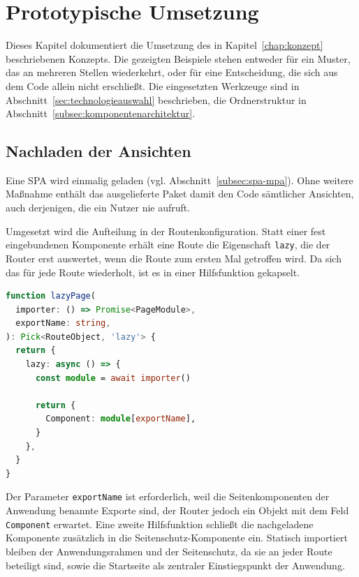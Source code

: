 
\chapter{Prototypische Umsetzung}
\label{chap:umsetzung}

Dieses Kapitel dokumentiert die Umsetzung des in
Kapitel~\ref{chap:konzept} beschriebenen Konzepts. Die gezeigten
Beispiele stehen entweder für ein Muster, das an mehreren Stellen
wiederkehrt, oder für eine Entscheidung, die sich aus dem Code allein
nicht erschließt. Die eingesetzten Werkzeuge sind in
Abschnitt~\ref{sec:technologieauswahl} beschrieben, die Ordnerstruktur
in Abschnitt~\ref{subsec:komponentenarchitektur}.

\section{Nachladen der Ansichten}
\label{sec:impl_lazyloading}
 
Eine \acs{SPA} wird einmalig geladen (vgl.
Abschnitt~\ref{subsec:spa-mpa}). Ohne weitere Maßnahme enthält das
ausgelieferte Paket damit den Code sämtlicher Ansichten, auch
derjenigen, die ein Nutzer nie aufruft.
 
Umgesetzt wird die Aufteilung in der Routenkonfiguration. Statt einer
fest eingebundenen Komponente erhält eine Route die Eigenschaft
\texttt{lazy}, die der Router erst auswertet, wenn die Route zum
ersten Mal getroffen wird. Da sich das für jede Route wiederholt, ist
es in einer Hilfsfunktion gekapselt.
 
\begin{lstlisting}[language=TypeScript,caption={Hilfsfunktion für das Nachladen einer Seitenkomponente (routes-lazy.tsx)},label={lst:lazy_route}]
function lazyPage(
  importer: () => Promise<PageModule>,
  exportName: string,
): Pick<RouteObject, 'lazy'> {
  return {
    lazy: async () => {
      const module = await importer()
 
      return {
        Component: module[exportName],
      }
    },
  }
}
\end{lstlisting}
 
Der Parameter \texttt{exportName} ist erforderlich, weil die
Seitenkomponenten der Anwendung benannte Exporte sind, der Router
jedoch ein Objekt mit dem Feld \texttt{Component} erwartet. Eine
zweite Hilfsfunktion schließt die nachgeladene Komponente zusätzlich
in die Seitenschutz-Komponente ein. Statisch importiert bleiben der
Anwendungsrahmen und der Seitenschutz, da sie an jeder Route
beteiligt sind, sowie die Startseite als zentraler Einstiegspunkt der
Anwendung.
 
